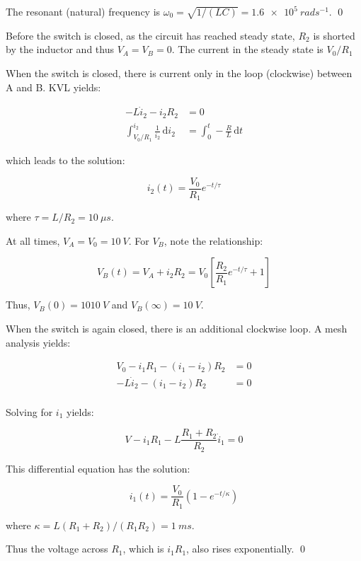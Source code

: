 \documentclass[12pt]{article}
\begin{document}
The resonant (natural) frequency is $\omega_{0} = \sqrt{1/(LC)} = \qty{1.6e5}{rad s^{-1}}$.
\qed


Before the switch is closed, as the circuit has reached steady state, $R_{2}$ is shorted by the inductor and thus $V_{A} = V_{B} = 0$. The current in the steady state is $V_{0}/R_{1}$

When the switch is closed, there is current only in the loop (clockwise) between A and B. KVL yields:

\begin{equation}
\begin{split}
    -L \dot{i}_{2} - i_{2} R_{2} &= 0 \\
    \int_{V_{0}/R_{1}}^{i_{2}} \frac{1}{i_{2}} \, \mathrm{d}i_{2} &= \int_{0}^{t} -\frac{R}{L} \, \mathrm{d}t
\end{split}
\end{equation}

which leads to the solution:

\begin{equation}
    i_{2}(t) = \frac{V_{0}}{R_{1}} e^{-t/\tau}
\end{equation}

where $\tau = L/R_{2} = \qty{10}{\mu s}$.

At all times, $V_{A} = V_{0} = \qty{10}{V}$. For $V_{B}$, note the relationship:

\begin{equation}
    V_{B}(t) = V_{A} + i_{2} R_{2} = V_{0} \left[ \frac{R_{2}}{R_{1}} e^{-t/\tau} + 1 \right]
\end{equation}

Thus, $V_{B}(0) = \qty{1010}{V}$ and $V_{B}(\infty) = \qty{10}{V}$.

When the switch is again closed, there is an additional clockwise loop. A mesh analysis yields:

\begin{equation}
\begin{split}
    V_{0} - i_{1} R_{1} - (i_{1} - i_{2}) R_{2} &= 0 \\
    -L \dot{i}_{2} - (i_{1} - i_{2}) R_{2} &= 0 \\
\end{split}
\end{equation}

Solving for $i_{1}$ yields:

\begin{equation}
    V - i_{1} R_{1} - L \frac{R_{1} + R_{2}}{R_{2}} \dot{i}_{1} = 0
\end{equation}

This differential equation has the solution:

\begin{equation}
    i_{1}(t) = \frac{V_{0}}{R_{1}} (1 - e^{-t/\kappa})
\end{equation}

where $\kappa = L(R_{1} + R_{2})/(R_{1} R_{2}) = \qty{1}{ms}$.

Thus the voltage across $R_{1}$, which is $i_{1}R_{1}$, also rises exponentially.
\qed
\end{document}
